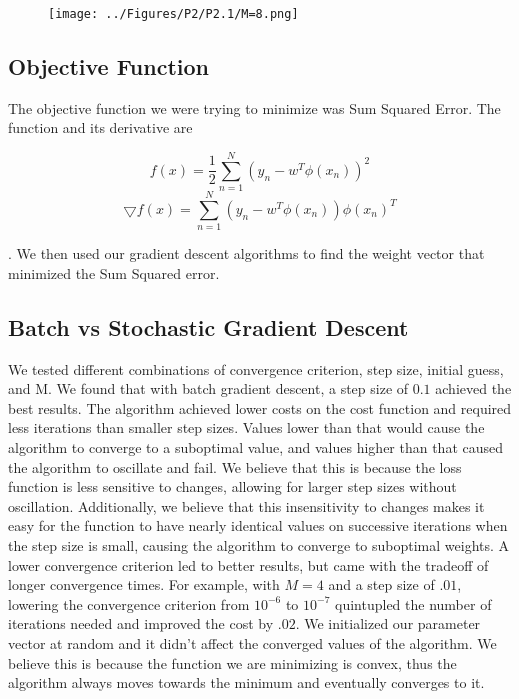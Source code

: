 \documentclass[a4paper,twoside]{article}
\begin{document}
\begin{figure}[h]
  \texttt{[image: ../Figures/P2/P2.1/M=8.png]}
  \caption{}
  \label{fig:gradient_converging}
\end{figure}

\subsection{Objective Function}

The objective function we were trying to minimize was Sum Squared Error. The function and its derivative are 

\begin{equation}
f(x) = \frac{1}{2} \sum_{n=1}^{N} (y_n - w^T \phi(x_n))^2
\end{equation}
\begin{equation}
\bigtriangledown f(x) = \sum_{n=1}^{N} (y_n - w^T \phi(x_n)) \phi(x_n)^T
\end{equation}

. We then used our gradient descent algorithms to find the weight vector that minimized the Sum Squared error. 

\subsection{Batch vs Stochastic Gradient Descent}

We tested different combinations of convergence criterion, step size, initial guess, and M. We found that with batch gradient descent, a step size of $0.1$ achieved the best results. The algorithm achieved lower costs on the cost function and required less iterations than smaller step sizes. Values lower than that would cause the algorithm to converge to a suboptimal value, and values higher than that caused the algorithm to oscillate and fail. We believe that this is because the loss function is less sensitive to changes, allowing for larger step sizes without oscillation. Additionally, we believe that this insensitivity to changes makes it easy for the function to have nearly identical values on successive iterations when the step size is small, causing the algorithm to converge to suboptimal weights. A lower convergence criterion led to better results, but came with the tradeoff of longer convergence times. For example, with $M=4$ and a step size of $.01$, lowering the convergence criterion from $10^{-6}$ to $10^{-7}$ quintupled the number of iterations needed and improved the cost by $.02$. We initialized our parameter vector at random and it didn't affect the converged values of the algorithm. We believe this is because the function we are minimizing is convex, thus the algorithm always moves towards the minimum and eventually converges to it. 
\end{document}
